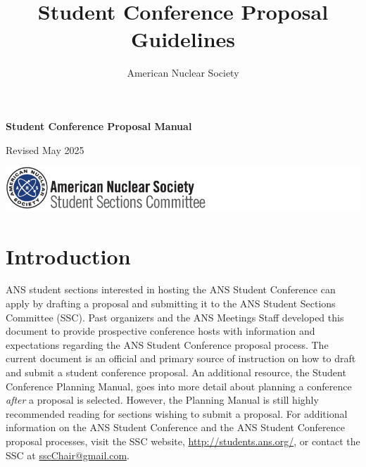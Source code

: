 \documentclass[12pt]{article}
\title{\textbf{Student Conference Proposal Guidelines}}
\author{American Nuclear Society}
\date{}
\begin{document}
\newcommand{\redcolor}{\textcolor{red}}

\begin{titlepage}
\vspace*{2cm}
\centering
{\Huge\bfseries Student Conference Proposal Manual\par}

\vspace{2cm}
\rm{\Large Revised May 2025\par }

\vfill
\includegraphics[scale=0.75]{SSClogo.png}
\end{titlepage}


\clearpage
{\hypersetup{linkcolor=black}
\tableofcontents
}

\newpage

\section{Introduction}

ANS student sections interested in hosting the ANS Student Conference can apply by drafting a proposal and submitting it to the ANS Student Sections Committee (SSC). Past organizers and the ANS Meetings Staff developed this document to provide prospective conference hosts with information and expectations regarding the ANS Student Conference proposal process. The current document is an official and primary source of instruction on how to draft and submit a student conference proposal. An additional resource, the Student Conference Planning Manual, goes into more detail about planning a conference \emph{after} a proposal is selected. However, the Planning Manual is still highly recommended reading for sections wishing to submit a proposal. For additional information on the ANS Student Conference and the ANS Student Conference proposal processes, visit the SSC website, \href{http://students.ans.org/}{http://students.ans.org/}, or contact the SSC at \href{mailto:sscChair@gmail.com}{sscChair@gmail.com}.
\end{document}
